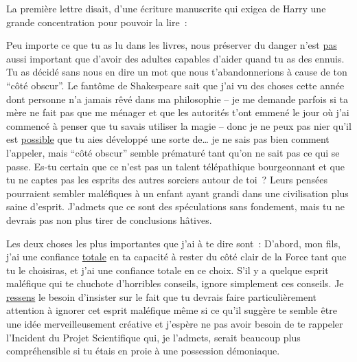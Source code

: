 La première lettre disait, d'une écriture manuscrite qui exigea de Harry une grande concentration pour pouvoir la lire~:
\begin{writtenNote}

Peu importe ce que tu as lu dans les livres, nous préserver du danger n'est \underline{pas} aussi important que d'avoir des adultes capables d'aider quand tu as des ennuis.
Tu as décidé sans nous en dire un mot que nous t'abandonnerions à cause de ton “côté obscur”.
Le fantôme de Shakespeare sait que j'ai vu des choses cette année dont personne n'a jamais rêvé dans ma philosophie -- je me demande parfois si ta mère ne fait pas que me ménager et que les autorités t'ont emmené le jour où j'ai commencé à penser que tu savais utiliser la magie -- donc je ne peux pas nier qu'il est \underline{possible} que tu aies développé une sorte de… je ne sais pas bien comment l'appeler, mais “côté obscur” semble prématuré tant qu'on ne sait pas ce qui se passe.
Es-tu certain que ce n'est pas un talent télépathique bourgeonnant et que tu ne captes pas les esprits des autres sorciers autour de toi~?
Leurs pensées pourraient sembler maléfiques à un enfant ayant grandi dans une civilisation plus saine d'esprit.
J'admets que ce sont des spéculations sans fondement, mais tu ne devrais pas non plus tirer de conclusions hâtives.

Les deux choses les plus importantes que j'ai à te dire sont~: D'abord, mon fils, j'ai une confiance \underline{totale} en ta capacité à rester du côté clair de la Force tant que tu le choisiras, et j'ai une confiance totale en ce choix.
S'il y a quelque esprit maléfique qui te chuchote d'horribles conseils, ignore simplement ces conseils.
Je \underline{ressens} le besoin d'insister sur le fait que tu devrais faire particulièrement attention à ignorer cet esprit maléfique même si ce qu'il suggère te semble être une idée merveilleusement créative et j'espère ne pas avoir besoin de te rappeler l'Incident du Projet Scientifique qui, je l'admets, serait beaucoup plus compréhensible si tu étais en proie à une possession démoniaque.


\end{writtenNote}
